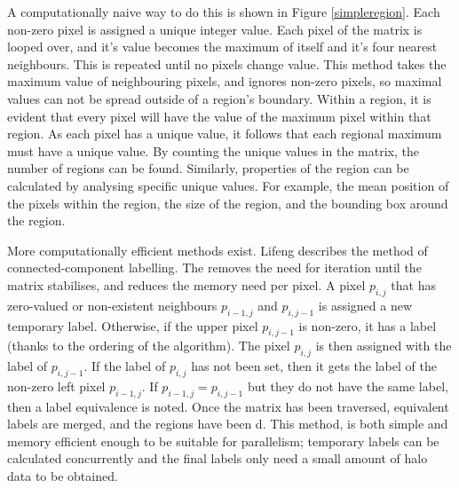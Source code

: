 \documentclass[../main.tex]{subfiles}
\begin{document}
    A computationally naive way to do this is shown in Figure \ref{simpleregion}.
    Each non-zero pixel is assigned a unique integer value.
    Each pixel of the matrix is looped over, and it's value becomes the maximum of itself and it's four nearest neighbours.
    This is repeated until no pixels change value.
    This method takes the maximum value of neighbouring pixels, and ignores non-zero pixels, so maximal values can not be spread outside of a region's boundary.
    Within a region, it is evident that every pixel will have the value of the maximum pixel within that region.
    As each pixel has a unique value, it follows that each regional maximum must have a unique value.
    By counting the unique values in the matrix, the number of regions can be found.
    Similarly, properties of the region can be calculated by analysing specific unique values.
    For example, the mean position of the pixels within the region, the size of the region, and the bounding box around the region.

    More computationally efficient methods exist.
    Lifeng \cite{efficientregion} describes the method of connected-component labelling.
    The removes the need for iteration until the matrix stabilises, and reduces the memory need per pixel.
    A pixel $p_{i,j}$ that has zero-valued or non-existent neighbours $p_{i-1,j}$ and $p_{i,j-1}$ is assigned a new temporary label.
    Otherwise, if the upper pixel $p_{i,j-1}$ is non-zero, it has a label (thanks to the ordering of the algorithm).
    The pixel $p_{i,j}$ is then assigned with the label of $p_{i,j-1}$.
    If the label of $p_{i,j}$ has not been set, then it gets the label of the non-zero left pixel $p_{i-1,j}$.
    If $p_{i-1,j} = p_{i,j-1}$ but they do not have the same label, then a label equivalence is noted.
    Once the matrix has been traversed, equivalent labels are merged, and the regions have been d.
    This method, is both simple and memory efficient enough to be suitable for parallelism; temporary labels can be calculated concurrently and the final labels only need a small amount of halo data to be obtained.
\end{document}
